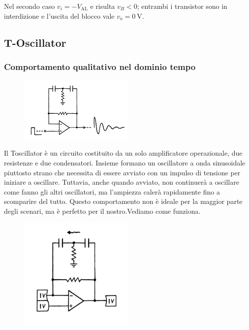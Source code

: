 \documentclass{article}
\newcommand{\var}[2]{#1_\mathrm{#2}}
\theoremstyle{definition}
\begin{document}
Nel secondo caso \(v_i = -\var{V}{AL}\) e risulta \(v_B < 0 \); entrambi i transistor sono in interdizione e l'uscita del blocco vale \(v_o = \qty{0}{\volt}\).


\subsection{T-Oscillator}
\subsubsection{Comportamento qualitativo nel dominio tempo}
\begin{figure}[ht]
    \centering
    \includegraphics[width=0.5\textwidth]{Toscillator.png} 
    \label{fig:Toscillator}
\end{figure}

Il Toscillator è un circuito costituito da un solo amplificatore operazionale, due resistenze e due condensatori. Insieme formano un oscillatore a onda sinusoidale piuttosto strano che necessita di essere avviato con un impulso di tensione per iniziare a oscillare.
Tuttavia, anche quando avviato, non continuerà a oscillare come fanno gli altri oscillatori, ma l'ampiezza calerà rapidamente fino a scomparire del tutto. Questo comportamento non è ideale per la maggior parte degli scenari, ma è perfetto per il nostro.Vediamo come funziona.

\begin{figure}[ht]
    \centering
    \includegraphics[width=0.5\textwidth]{Toscillator1.png} 
    \label{fig:Toscillator1}
\end{figure}
\end{document}
